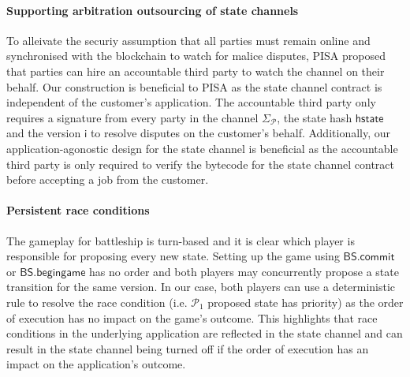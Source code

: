 \documentclass{llncs}
\newcommand{\hstate}{\mathsf{hstate}}
\newcommand{\monotoniccounter}{\mathsf{i}}
\newcommand{\participant}{\mathcal{P}}
\newcommand{\battleshipbegin}{\mathsf{BS.begingame}}
\newcommand{\battleshipcommit}{\mathsf{BS.commit}}
\newcommand{\timerchallenge}{\mathsf{\Delta}_{\mathsf{challenge}}}
\newcommand{\timechallenge}{\mathsf{t}_{\mathsf{challenge}}}
\newcommand{\timerextra}{\mathsf{\Delta}_{\mathsf{extra}}}
\newcommand{\timerdispute}{\mathsf{\Delta}_{\mathsf{dispute}}}
\begin{document}


\paragraph{Supporting arbitration outsourcing of state channels} 
To alleivate the securiy assumption that all parties must remain online and synchronised with the blockchain to watch for malice disputes, PISA \cite{mccorry2018pisa} proposed that parties can hire an accountable third party to watch the channel on their behalf. 
Our construction is beneficial to PISA as the state channel contract is independent of the customer's application. 
The accountable third party only requires a signature from every party in the channel $\Sigma_{\participant}$, the state hash $\hstate$ and the version $\monotoniccounter$ to resolve disputes on the customer's behalf. 
Additionally, our application-agonostic design for the state channel is beneficial as the accountable third party is only required to verify the bytecode for the state channel contract before accepting a job from the customer. 

\paragraph{Persistent race conditions} 
The gameplay for battleship is turn-based and it is clear which player is responsible for proposing every new state. 
Setting up the game using $\battleshipcommit$ or $\battleshipbegin$ has no order and both players may concurrently propose a state transition for the same version. 
In our case, both players can use a deterministic rule to resolve the race condition (i.e. $\participant_{1}$ proposed state has priority) as the order of execution has no impact on the game's outcome. 
This highlights that race conditions in the underlying application are reflected in the state channel and can result in the state channel being turned off if the order of execution has an impact on the application's outcome. 
\end{document}
